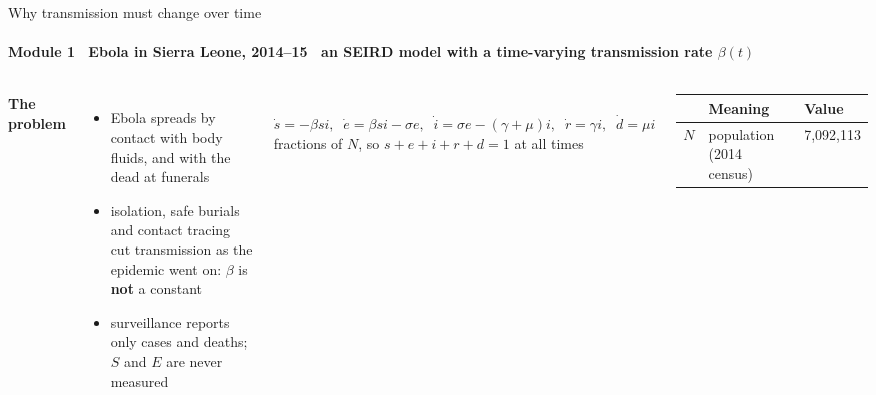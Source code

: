 \begin{frame}{Why transmission must change over time}
\framesubtitle{Module 1 \textbullet\ Ebola in Sierra Leone, 2014--15 \textbullet\ an SEIRD model with a time-varying transmission rate $\beta(t)$}
\vspace{-2pt}
\begin{columns}[T,onlytextwidth]
  \footnotesize\raggedright
  \textbf{\color{mvPINN}The problem}
  \begin{itemize}\setlength{\itemsep}{1pt}
    \item Ebola spreads by contact with body fluids, and with the dead at funerals
    \item isolation, safe burials and contact tracing cut transmission as the epidemic went on: $\beta$ is \textbf{not} a constant
    \item surveillance reports only cases and deaths; $S$ and $E$ are never measured
  \end{itemize}
  \vspace{4pt}
  \centering
  \\[3pt]
  {\scriptsize $\dot s = -\beta s i,\;\; \dot e = \beta s i - \sigma e,\;\; \dot i = \sigma e - (\gamma+\mu) i,\;\; \dot r = \gamma i,\;\; \dot d = \mu i$\\[1pt]
  fractions of $N$, so $s+e+i+r+d = 1$ at all times}
  \scriptsize\setlength{\tabcolsep}{4pt}
  \begin{tabular}{@{}lll@{}}
    \toprule
    & Meaning & Value \\
    \midrule
    $N$      & population (2014 census)  & 7{,}092{,}113 \\

\end{tabular}
\end{columns}
\end{frame}
